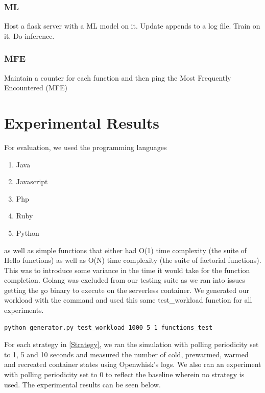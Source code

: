 \documentclass{article}
\begin{document}
\subsubsection{ML}

Host a flask server with a ML model on it. Update appends to a log file. Train on it. Do inference.

\subsubsection{MFE}

Maintain a counter for each function and then ping the Most Frequently Encountered (MFE)

\section{Experimental Results}

For evaluation, we used the programming languages

\begin{enumerate}
    \item Java
    \item Javascript
    \item Php
    \item Ruby
    \item Python
\end{enumerate}

as well as simple functions that either had O(1) time complexity (the suite of Hello functions) as well as O(N) time complexity (the suite of factorial functions). This was to introduce some variance in the time it would take for the function completion. Golang was excluded from our testing suite as we ran into issues getting the go binary to execute on the serverless container. We generated our workload with the command and used this same test\_workload function for all experiments.

\begin{lstlisting}[language=bash,caption={Generating the workload}]
python generator.py test_workload 1000 5 1 functions_test 
\end{lstlisting}

For each strategy in \ref{Strategy}, we ran the simulation with polling periodicity set to 1, 5 and 10 seconds and measured the number of cold, prewarmed, warmed and recreated container states using Openwhisk's logs. We also ran an experiment with polling periodicity set to 0 to reflect the baseline wherein no strategy is used. The experimental results can be seen below.
\end{document}
